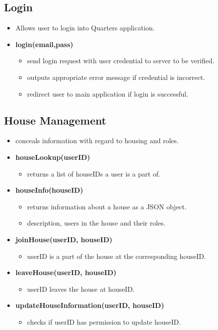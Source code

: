 \documentclass[12pt]{article}
\begin{document}
\subsection{Login}
\begin{itemize}
    \item Allows user to login into Quarters application.
    \item \textbf{login(email,pass)}
    \begin{itemize}
        \item send login request with user credential to server to be verified.
        \item outputs appropriate error message if credential is incorrect.
        \item redirect user to main application if login is successful.
    \end{itemize}
\end{itemize}


\subsection{House Management}
\begin{itemize}
    \item conceals information with regard to housing and roles.
    \item \textbf{houseLookup(userID)}
    \begin{itemize}
        \item returns a list of houseIDs a user is a part of.
    \end{itemize}
    \item \textbf{houseInfo(houseID)}
    \begin{itemize}
        \item returns information about a house as a JSON object.
        \item description, users in the house and their roles.
    \end{itemize}
    \item \textbf{joinHouse(userID, houseID)}
    \begin{itemize}
        \item userID is a part of the house at the corresponding houseID.
    \end{itemize}
    \item \textbf{leaveHouse(userID, houseID)}
    \begin{itemize}
        \item userID leaves the house at houseID.
    \end{itemize}
    \item \textbf{updateHouseInformation(userID, houseID)}
    \begin{itemize}
        \item checks if userID has permission to update houseID.
    \end{itemize}
\end{itemize}
\end{document}
